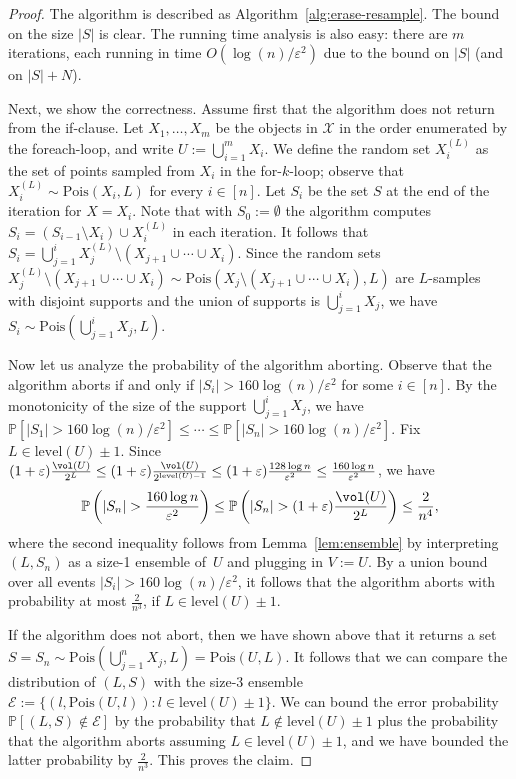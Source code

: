 \documentclass[a4paper, 11pt]{article}
\newcommand{\Pois}{\mathrm{Pois}}
\newcommand{\level}{\mathrm{level}}
\newcommand{\eps}{\varepsilon}
\renewcommand{\Pr}{\mathbb{P}}
\newcommand{\class}[1]{\mathcal{#1}}
\begin{document}
\begin{proof}
    The algorithm is described as Algorithm~\ref{alg:erase-resample}.
    The bound on the size $|S|$ is clear. The running time analysis is also easy: there are $m$ iterations, each running in time $O(\log(n)/\eps^2)$ due to the bound on $|S|$ (and on $|S|+N$).
    
    Next, we show the correctness. 
    Assume first that the algorithm does not return from the if-clause.
    Let $X_1, \dots, X_m$ be the objects in $\class{X}$ in the order enumerated by the foreach-loop, and write $U := \bigcup_{i=1}^m X_i$.
    We define the random set $X_i^{(L)}$ as the set of points sampled from $X_i$ in the for-$k$-loop; observe that $X_i^{(L)} \sim \Pois(X_i, L)$ for every $i \in [n]$.
    Let $S_i$ be the set $S$ at the end of the iteration for $X = X_i$. Note that with $S_0 := \emptyset$ the algorithm computes $S_i = (S_{i-1} \setminus X_i) \cup X_i^{(L)}$ in each iteration.
    It follows that $S_i = \bigcup_{j=1}^i X_j^{(L)} \setminus (X_{j+1} \cup \cdots \cup X_i)$. Since the random sets $X_j^{(L)} \setminus (X_{j+1} \cup \cdots \cup X_i) \sim \Pois(X_j \setminus (X_{j+1} \cup \cdots \cup X_i), L)$ are $L$-samples with disjoint supports and the union of supports is $\bigcup_{j=1}^i X_j$, we have $S_i \sim \Pois(\bigcup_{j=1}^i X_j, L)$.
    
    Now let us analyze the probability of the algorithm aborting. Observe that the algorithm aborts if and only if $|S_i| > 160 \log(n)/\eps^2$ for some $i \in [n]$. By the monotonicity of the size of the support $\bigcup_{j=1}^i X_j$, we have $\Pr[|S_1| > 160 \log(n)/\eps^2] \le \cdots \le \Pr[|S_n| > 160 \log(n)/\eps^2]$.
    Fix $L \in \level(U) \pm 1$. Since $(1 + \eps) \frac{\vol(U)}{2^L} \leq (1 + \eps) \frac{\vol(U)}{2^{\level(U)-1}} \leq (1+\eps) \frac{128 \log n}{\eps^2} \leq \frac{160 \log n}{\eps^2}$, we have
    \[
        \Pr\left( |S_n| > \frac{160 \log n}{\eps^2} \right)
        \leq \Pr\left( |S_n| > (1 + \eps) \frac{\vol(U)}{2^L} \right)
        \leq \frac{2}{n^4},
    \]
    where the second inequality follows from Lemma~\ref{lem:ensemble} by interpreting $(L,S_n)$ as a size-1 ensemble of~$U$ and plugging in $V := U$.
    By a union bound over all events $|S_i| > 160 \log(n)/\eps^2$, it follows that the algorithm aborts with probability at most $\tfrac 2{n^3}$, if $L \in \level(U) \pm 1$.

    If the algorithm does not abort, then we have shown above that it returns a set $S = S_n \sim \Pois(\bigcup_{j=1}^n X_j, L) = \Pois(U, L)$. 
    It follows that we can compare the distribution of $(L,S)$ with the size-3 ensemble $\mathcal{E} := \{(l, \Pois(U,l)) \colon l \in \level(U) \pm 1\}$. We can bound the error probability $\Pr[(L,S) \not\in \mathcal{E}]$ by the probability that $L \not\in \level(U) \pm 1$ plus the probability that the algorithm aborts assuming $L \in \level(U) \pm 1$, and we have bounded the latter probability by $\tfrac 2{n^3}$. This proves the claim.
\end{proof}
\end{document}
